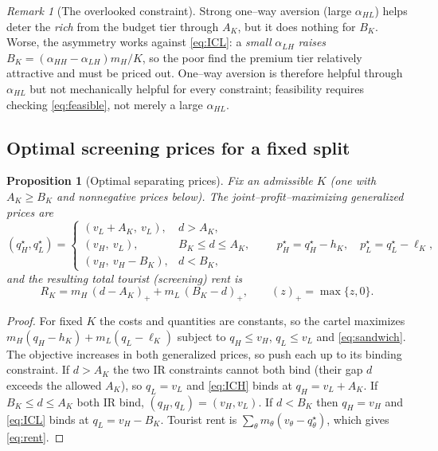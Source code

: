 \documentclass[11pt]{article}
\theoremstyle{plain}
\newtheorem{proposition}{Proposition}
\theoremstyle{definition}
\theoremstyle{remark}
\newtheorem{remark}{Remark}
\newcommand{\mH}{m_{H}}
\newcommand{\mL}{m_{L}}
\newcommand{\vH}{v_{H}}
\newcommand{\vL}{v_{L}}
\newcommand{\aHH}{\alpha_{HH}}
\newcommand{\aHL}{\alpha_{HL}}
\newcommand{\aLH}{\alpha_{LH}}
\newcommand{\pos}[1]{\left(#1\right)_{+}}
\begin{document}
\begin{remark}[The overlooked constraint]\label{rem:ICL}
Strong one--way aversion (large $\aHL$) helps deter the \emph{rich} from the budget tier
through $A_K$, but it does nothing for $B_K$. Worse, the asymmetry works against
\eqref{eq:ICL}: a \emph{small} $\aLH$ \emph{raises} $B_K=(\aHH-\aLH)\mH/K$, so the poor find
the premium tier relatively attractive and must be priced out. One--way aversion is therefore
helpful through $\aHL$ but not mechanically helpful for every constraint; feasibility requires
checking \eqref{eq:feasible}, not merely a large $\aHL$.
\end{remark}

\subsection{Optimal screening prices for a fixed split}

\begin{proposition}[Optimal separating prices]\label{prop:prices}
Fix an \emph{admissible} $K$ (one with $A_K\ge B_K$ and nonnegative prices below). The
joint--profit--maximizing generalized prices are
\begin{equation}
(q_H^\star,q_L^\star)=
\begin{cases}
(\vL+A_K,\ \vL), & d>A_K,\\[2pt]
(\vH,\ \vL), & B_K\le d\le A_K,\\[2pt]
(\vH,\ \vH-B_K), & d<B_K,
\end{cases}
\qquad
p_H^\star=q_H^\star-h_K,\quad p_L^\star=q_L^\star-\ell_K,
\end{equation}
and the resulting total tourist (screening) rent is
\begin{equation}
\boxed{\ R_K=\mH\,\pos{d-A_K}+\mL\,\pos{B_K-d}, \qquad \pos{z}=\max\{z,0\}. \ }
\label{eq:rent}
\end{equation}
\end{proposition}

\begin{proof}
For fixed $K$ the costs and quantities are constants, so the cartel maximizes
$\mH(q_H-h_K)+\mL(q_L-\ell_K)$ subject to $q_H\le\vH$, $q_L\le\vL$ and \eqref{eq:sandwich}. The
objective increases in both generalized prices, so push each up to its binding constraint. If
$d>A_K$ the two IR constraints cannot both bind (their gap $d$ exceeds the allowed $A_K$), so
$q_L=\vL$ and \eqref{eq:ICH} binds at $q_H=\vL+A_K$. If $B_K\le d\le A_K$ both IR bind,
$(q_H,q_L)=(\vH,\vL)$. If $d<B_K$ then $q_H=\vH$ and \eqref{eq:ICL} binds at $q_L=\vH-B_K$.
Tourist rent is $\sum_\theta m_\theta(v_\theta-q_\theta^\star)$, which gives \eqref{eq:rent}.
\end{proof}
\end{document}
